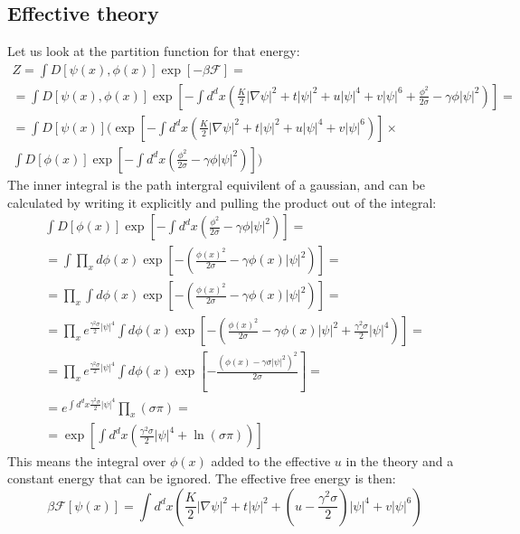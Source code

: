 \documentclass{article}
\begin{document}
\subsection{Effective theory}
Let us look at the partition function for that energy:
\begin{equation}
\begin{gathered}
    Z = \int D[\psi(x), \phi(x)]\exp[-\beta\mathcal{F}] = \\ =
    \int D[\psi(x), \phi(x)] \exp[-\int d^dx\left(
        \frac{K}{2}\left|\nabla\psi\right|^2 + t\left|\psi\right|^2 + u\left|\psi\right|^4 + v\left|\psi\right|^6 + \frac{\phi^2}{2\sigma} - \gamma\phi\left|\psi\right|^2
    \right)] = \\ =
    \int D[\psi(x)] 
    \Biggl(
    \exp[-\int d^dx\left(
        \frac{K}{2}\left|\nabla\psi\right|^2 + t\left|\psi\right|^2 + u\left|\psi\right|^4 + v\left|\psi\right|^6
    \right)] \times \\
    \int D[\phi(x)]
    \exp[-\int d^dx\left(
        \frac{\phi^2}{2\sigma} - \gamma\phi\left|\psi\right|^2
    \right)]
    \Biggr)
\end{gathered}
\end{equation}
The inner integral is the path intergral equivilent of a gaussian, and can be calculated by writing it explicitly and pulling the product out of the integral:
\begin{equation}
\begin{gathered}
    \int D[\phi(x)]
    \exp[-\int d^dx\left(
        \frac{\phi^2}{2\sigma} - \gamma\phi\left|\psi\right|^2
    \right)] = \\ =
    \int \prod_x d\phi(x) \exp[-\left(
        \frac{\phi(x)^2}{2\sigma} - \gamma\phi(x)\left|\psi\right|^2
    \right)] = \\ =
     \prod_x \int d\phi(x) \exp[-\left(
        \frac{\phi(x)^2}{2\sigma} - \gamma\phi(x)\left|\psi\right|^2
    \right)] = \\ =
    \prod_x e^{\frac{\gamma^2\sigma}{2}\left|\psi\right|^4}\int d\phi(x) \exp[-\left(
        \frac{\phi(x)^2}{2\sigma} - \gamma\phi(x)\left|\psi\right|^2 + \frac{\gamma^2\sigma}{2}\left|\psi\right|^4
    \right)] = \\ =
    \prod_x e^{\frac{\gamma^2\sigma}{2}\left|\psi\right|^4}\int d\phi(x) \exp[-\frac{\left(\phi(x) - \gamma\sigma\left|\psi\right|^2\right)^2}{2\sigma}] = \\ =
    e^{\int d^dx \frac{\gamma^2\sigma}{2}\left|\psi\right|^4}
    \prod_x \left(\sigma \pi\right) = \\ =
    \exp[\int d^dx \left(
        \frac{\gamma^2\sigma}{2}\left|\psi\right|^4 + \ln(\sigma\pi)
    \right)]
\end{gathered}
\end{equation}
This means the integral over $\phi(x)$ added to the effective $u$ in the theory and a constant energy that can be ignored. The effective free energy is then:
\begin{equation}
    \beta \mathcal{F}[\psi(x)] = \int d^dx\left(
        \frac{K}{2}\left|\nabla\psi\right|^2 + t\left|\psi\right|^2 + \left(u - \frac{\gamma^2\sigma}{2}\right)\left|\psi\right|^4 + v\left|\psi\right|^6
    \right)
\end{equation}
\end{document}
